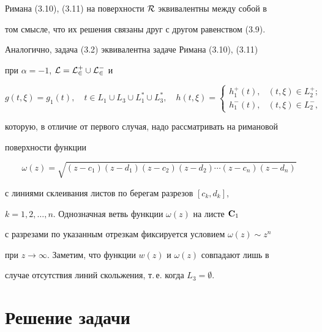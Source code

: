 Римана (3.10), (3.11) на поверхности $\cal R$ эквивалентны между собой в 


том смысле, что их решения связаны друг с другом равенством (3.9). 


Аналогично, задача (3.2) эквивалентна задаче Римана (3.10), (3.11) 


при $\alpha=-1$, $\cal L=L^+_2\cup L^-_2$ и 


\begin{equation} 


g(t,\xi)=g_1(t),\quad t\in L_1\cup L_3\cup L^*_1\cup L^*_3,\quad 


h(t,\xi)= 


\begin{cases} 


h^+_1(t), & (t,\xi)\in L^+_2;\\ 


h^-_1(t), & (t,\xi)\in L^-_2, 


\end{cases} 


\end{equation} 


которую, в отличие от первого случая, надо рассматривать на римановой 


поверхности функции 


\begin{equation} 


\omega(z)=\sqrt{(z-c_1)(z-d_1)(z-c_2)(z-d_2)\dotsb 


(z-c_n)(z-d_n)} 


\end{equation} 


с линиями склеивания листов по берегам разрезов $[c_k,d_k]$, 


$k=1,2,\dotsc,n$. Однозначная ветвь функции $\omega(z)$ на листе $\bold C_1$ 


с разрезами по указанным отрезкам фиксируется условием $\omega(z)\sim z^n$ 


при $z\to\infty$. Заметим, что функции $w(z)$ и $\omega(z)$ совпадают лишь в 


случае отсутствия линий скольжения, т.\,е. когда $L_3=\emptyset$. 


 


 


\section{Решение задачи} 


